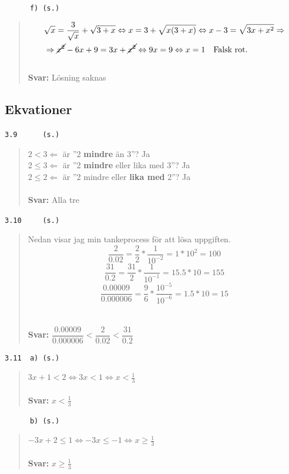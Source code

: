 \documentclass[a4paper]{article}
\newcommand{\tskcol}[1]{\textcolor{tskcol}{#1}}
\begin{document}
	\texttt{\tskcol{~~~~~~f) (s.)}}
	\begin{quotation}
		\noindent
		\begin{align*}
		&\sqrt{x}=\dfrac{3}{\sqrt{x}}+\sqrt{3+x} \Leftrightarrow
		x=3+\sqrt{x(3+x)} \Leftrightarrow
		x-3=\sqrt{3x+x^2} \Rightarrow \\
		&\Rightarrow \cancel{x^2}-6x+9=3x+\cancel{x^2} \Leftrightarrow
		9x=9 \Leftrightarrow
		x=1 \text{~~~Falsk rot.}
		\end{align*}
		\\
		\textbf{Svar:} Lösning saknas
	\end{quotation}
	
	\subsection*{Ekvationer}
	
	\texttt{\tskcol{3.9~~~~~ (s.)}}
	\begin{quotation}
		\noindent
		$2<3 \Leftarrow$ är ''2 \textbf{mindre} än 3''? Ja \\
		$2 \le 3 \Leftarrow$ är ''2 \textbf{mindre} eller lika med 3''? Ja \\
		$2 \le 2 \Leftarrow$ är ''2 mindre eller \textbf{lika med} 2''? Ja 
		\\ \\
		\textbf{Svar:} Alla tre
	\end{quotation}
	
	\texttt{\tskcol{3.10~~~~ (s.)}}
	\begin{quotation}
		\noindent
		Nedan visar jag min tankeprocess för att lösa uppgiften.
		\[\frac{2}{0.02}=
		\frac{2}{2}*\frac{1}{10^{-2}}=
		1*10^2=
		100\]
		\[\frac{31}{0.2}=
		\frac{31}{2}*\frac{1}{10^{-1}}=
		15.5*10=
		155\]
		\[\frac{0.00009}{0.000006}=
		\frac{9}{6}*\frac{10^{-5}}{10^{-6}}=
		1.5*10=
		15\]
		\\ \\
		\textbf{Svar:} $\dfrac{0.00009}{0.000006}<\dfrac{2}{0.02}<\dfrac{31}{0.2}$
	\end{quotation}
	
	\texttt{\tskcol{3.11~~a) (s.)}}
	\begin{quotation}
		\noindent
		$3x+1<2 \Leftrightarrow
		3x<1 \Leftrightarrow
		x<\frac{1}{3}$
		\\ \\
		\textbf{Svar:} $x<\frac{1}{3}$
	\end{quotation}
	
	\texttt{\tskcol{~~~~~~b) (s.)}}
	\begin{quotation}
		\noindent
		$-3x+2\le1 \Leftrightarrow
		-3x\le-1 \Leftrightarrow
		x\ge\frac{1}{3}$
		\\ \\
		\textbf{Svar:} $x\ge\frac{1}{3}$
	\end{quotation}
	
\end{document}
